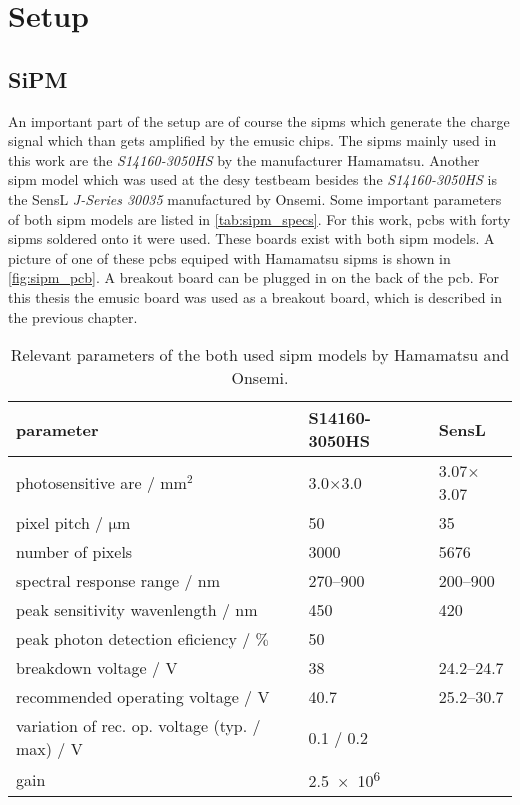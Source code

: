 \chapter{Setup}

\section{SiPM}
An important part of the setup are of course the \acp{sipm} which generate the charge signal which than gets amplified by the \ac{emusic} chips.
The \acp{sipm} mainly used in this work are the \textit{S14160-3050HS} by the manufacturer Hamamatsu.
Another \ac{sipm} model which was used at the \ac{desy} testbeam besides the \textit{S14160-3050HS} is the SensL \textit{J-Series 30035} manufactured by Onsemi.
Some important parameters of both \ac{sipm} models are listed in \autoref{tab:sipm_specs}.
For this work, \acp{pcb} with forty \acp{sipm} soldered onto it were used.
These boards exist with both \ac{sipm} models.
A picture of one of these \acp{pcb} equiped with Hamamatsu \acp{sipm} is shown in \autoref{fig:sipm_pcb}.
A breakout board can be plugged in on the back of the \ac{pcb}.
For this thesis the \ac{emusic} board was used as a breakout board, which is described in the previous chapter.
\begin{table}
	\centering
	\caption[SiPM parameters]{Relevant parameters of the both used \ac{sipm} models by Hamamatsu and Onsemi. \cite{}}
	\label{tab:sipm_specs}
	\renewcommand{\arraystretch}{1.3}
	\begin{tabularx}{\textwidth}{Xp{}p{}}
	    \toprule
	    parameter								& S14160-3050HS		& SensL			\\\midrule
	    photosensitive are / $\si{\milli\meter\squared}$			& 3.0$\times$3.0	& 3.07$\times$3.07	\\
	    pixel pitch / $\si{\micro\meter}$					& 50			& 35			\\
	    number of pixels							& 3000			& \num{5676}		\\
	    spectral response range / $\si{\nano\meter}$			& \numrange{270}{900}	& \numrange{200}{900}	\\
	    peak sensitivity wavenlength / $\si{\nano\meter}$			& 450			& 420			\\
	    peak photon detection eficiency / $\si{\percent}$			& 50			& 			\\
	    breakdown voltage / $\si{\volt}$					& 38			& \numrange{24.2}{24.7}	\\
	    recommended operating voltage / $\si{\volt}$			& 40.7			& \numrange{25.2}{30.7}	\\
	    variation of rec. op. voltage (typ. / max) / $\si{\volt}$		& 0.1 / 0.2		&			\\
	    gain								& \num{2.5e6}		&			\\
	    \bottomrule
	\end{tabularx}
	\renewcommand{\arraystretch}{1}
\end{table} 

